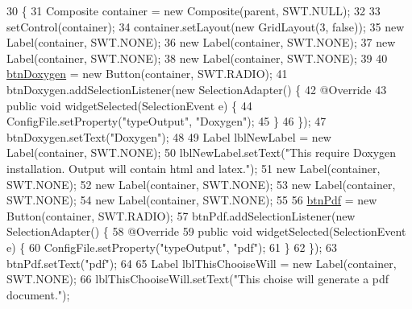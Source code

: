 \begin{DoxyCode}
30                                                 \{
31         Composite container = \textcolor{keyword}{new} Composite(parent, SWT.NULL);
32 
33         setControl(container);
34         container.setLayout(\textcolor{keyword}{new} GridLayout(3, \textcolor{keyword}{false}));
35         \textcolor{keyword}{new} Label(container, SWT.NONE);
36         \textcolor{keyword}{new} Label(container, SWT.NONE);
37         \textcolor{keyword}{new} Label(container, SWT.NONE);
38         \textcolor{keyword}{new} Label(container, SWT.NONE);
39         
40         \hyperlink{classit_1_1isislab_1_1masonhelperdocumentation_1_1mason_1_1wizards_1_1_a1___choose_output_ac2ea8ed088a188d85870e9afb90b8f88}{btnDoxygen} = \textcolor{keyword}{new} Button(container, SWT.RADIO);
41         btnDoxygen.addSelectionListener(\textcolor{keyword}{new} SelectionAdapter() \{
42             @Override
43             \textcolor{keyword}{public} \textcolor{keywordtype}{void} widgetSelected(SelectionEvent e) \{
44                 ConfigFile.setProperty(\textcolor{stringliteral}{"typeOutput"}, \textcolor{stringliteral}{"Doxygen"});
45             \}
46         \});
47         btnDoxygen.setText(\textcolor{stringliteral}{"Doxygen"});
48         
49         Label lblNewLabel = \textcolor{keyword}{new} Label(container, SWT.NONE);
50         lblNewLabel.setText(\textcolor{stringliteral}{"This require Doxygen installation. Output will contain html and latex."});
51         \textcolor{keyword}{new} Label(container, SWT.NONE);
52         \textcolor{keyword}{new} Label(container, SWT.NONE);
53         \textcolor{keyword}{new} Label(container, SWT.NONE);
54         \textcolor{keyword}{new} Label(container, SWT.NONE);
55         
56         \hyperlink{classit_1_1isislab_1_1masonhelperdocumentation_1_1mason_1_1wizards_1_1_a1___choose_output_ae7d5e743ab4af65fec8563ca08ed561c}{btnPdf} = \textcolor{keyword}{new} Button(container, SWT.RADIO);
57         btnPdf.addSelectionListener(\textcolor{keyword}{new} SelectionAdapter() \{
58             @Override
59             \textcolor{keyword}{public} \textcolor{keywordtype}{void} widgetSelected(SelectionEvent e) \{
60                 ConfigFile.setProperty(\textcolor{stringliteral}{"typeOutput"}, \textcolor{stringliteral}{"pdf"});
61             \}
62         \});
63         btnPdf.setText(\textcolor{stringliteral}{"pdf"});
64         
65         Label lblThisChooiseWill = \textcolor{keyword}{new} Label(container, SWT.NONE);
66         lblThisChooiseWill.setText(\textcolor{stringliteral}{"This choise will generate a pdf document."});

\end{DoxyCode}
